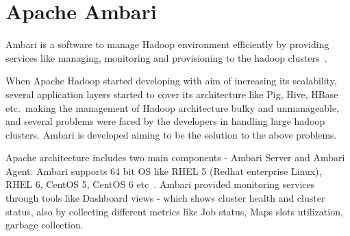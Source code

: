 \section{Apache Ambari}  

Ambari is a software  to manage Hadoop environment efficiently by providing
services like managing, monitoring and provisioning to the hadoop clusters~\cite
{hid-sp18-401-wiki-Ambari}.

When Apache Hadoop started developing with aim of increasing its scalability,
several application layers started to cover its architecture like Pig, Hive,
HBase etc.\ making the management of Hadoop architecture bulky and unmanageable,
and several problems were faced by the developers in handling large hadoop
clusters. Ambari is developed aiming to be the solution to the above problems.


Apache architecture includes two main components - Ambari Server and Ambari
Agent. Ambari supports 64 bit OS like RHEL 5 (Redhat enterprise Linux), RHEL 6,
CentOS 5, CentOS 6 etc~\cite{hid-sp18-401-Ambari}. Ambari provided monitoring
services through tools like Dashboard views - which shows cluster health and
cluster status, also by collecting different metrics like Job status, Maps slots
utilization, garbage collection.


